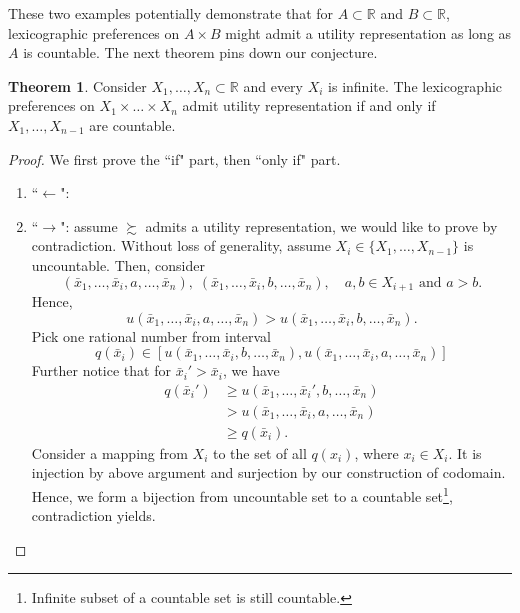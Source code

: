 \documentclass[a4paper, 12pt]{article}
\theoremstyle{definition}
\newtheorem{theorem}{Theorem}
\begin{document}
These two examples potentially demonstrate that for $A\subset\mathbb{R}$ and $B\subset\mathbb{R}$, lexicographic preferences on $A\times B$ might admit a utility representation as long as $A$ is countable. The next theorem pins down our conjecture.

\begin{theorem}
Consider $X_1,\dots,X_n\subset\mathbb{R}$ and every $X_i$ is infinite. The lexicographic preferences on $X_1\times\dots\times X_n$ admit utility representation if and only if $X_1,\dots,X_{n-1}$ are countable. 
\end{theorem}
\begin{proof}
We first prove the ``if" part, then ``only if" part.
\begin{enumerate}[label = (\roman*)]
\item ``$\leftarrow$":
\item ``$\rightarrow$": assume $\succsim$ admits a utility representation, we would like to prove by contradiction. Without loss of generality, assume $X_i\in\{X_1,\dots,X_{n-1}\}$ is uncountable. Then, consider 
\[
(\bar{x}_1,\dots,\bar{x}_i,a,\dots,\bar{x}_n),\; (\bar{x}_1,\dots,\bar{x}_i,b,\dots,\bar{x}_n), \quad a,b\in X_{i+1}\text{ and }a>b.
\]
Hence,
\[
u(\bar{x}_1,\dots,\bar{x}_i,a,\dots,\bar{x}_n) > u(\bar{x}_1,\dots,\bar{x}_i,b,\dots,\bar{x}_n).
\]
Pick one rational number from interval 
\[
q(\bar{x}_i)\in[u(\bar{x}_1,\dots,\bar{x}_i,b,\dots,\bar{x}_n), u(\bar{x}_1,\dots,\bar{x}_i,a,\dots,\bar{x}_n)]
\]
Further notice that for $\bar{x}_i'>\bar{x}_i$, we have
\begin{align*}
q(\bar{x}_i')&\geq u(\bar{x}_1,\dots,\bar{x}_i',b,\dots,\bar{x}_n)\\
&> u(\bar{x}_1,\dots,\bar{x}_i,a,\dots,\bar{x}_n)\\
&\geq q(\bar{x}_i).
\end{align*}
Consider a mapping from $X_i$ to the set of all $q(x_i)$, where $x_i\in X_i$. It is injection by above argument and surjection by our construction of codomain. Hence, we form a bijection from uncountable set to a countable set\footnote{Infinite subset of a countable set is still countable.}, contradiction yields.
\end{enumerate}
\end{proof}
\end{document}
